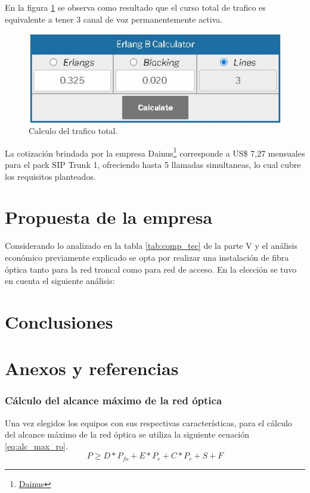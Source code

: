 \documentclass[11pt,a4paper]{article}
\begin{document}
En la figura \ref{fig:erla} se observa como resultado que el curso total de trafico es equivalente a tener 3 canal de voz permanentemente activa. 

\begin{figure}[htbp]
  \centering
  \includegraphics[width=0.6\linewidth]{fotos_julian/erlang}
  \caption{Calculo del trafico total.}
  \label{fig:erla}
\end{figure}

La cotización brindada por la empresa Dainus\footnote{\href{https://dainus.net/sip}{Dainus}} corresponde a US\$ 7,27 mensuales para el pack SIP Trunk 1, ofreciendo hasta 5 llamadas simultaneas, lo cual cubre los requisitos planteados.   



\part{Propuesta de la empresa}

Considerando lo analizado en la tabla \ref{tab:comp_tec} de la parte V y el análisis económico previamente explicado se opta por realizar una instalación de fibra óptica tanto para la red troncal como para red de acceso.
En la elección se tuvo en cuenta el siguiente análisis: 


\part{Conclusiones}

\part{Anexos y referencias}

\section{Cálculo del alcance máximo de la red óptica}
\label{section:calculo_alc_max_fo}
Una vez elegidos los equipos con sus respectivas características, para el cálculo del alcance máximo de la red óptica se utiliza la siguiente ecuación \ref{eq:alc_max_ro}. 
\begin{equation}
  P \geq D*P_{fo}+E*P_e+C*P_c+S+F
  \label{eq:alc_max_ro} 
\end{equation}
\end{document}
